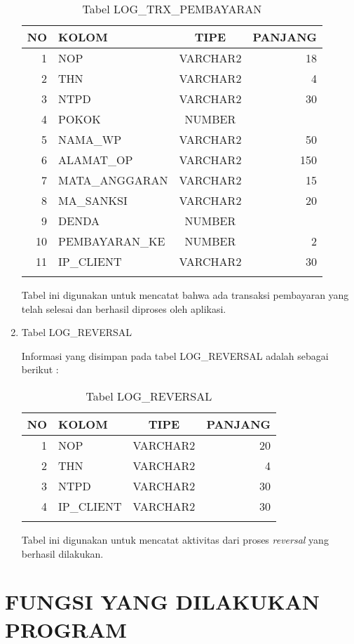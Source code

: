 \documentclass[pdftex,12pt, oneside]{article}
\begin{document}
\begin{enumerate}[1.]
  \begin{longtable}{|r|l|c|r|}
    \hline
    \textbf{NO} & \textbf{KOLOM} & \textbf{TIPE} & \textbf{PANJANG} \\
    \hline \hline
    1 & NOP & VARCHAR2 & 18 \\
    \hline
    2 & THN & VARCHAR2 & 4 \\
    \hline
    3 & NTPD & VARCHAR2 & 30 \\
    \hline
    4 & POKOK & NUMBER & \\
    \hline
    5 & NAMA\_WP & VARCHAR2 & 50 \\
    \hline
    6 & ALAMAT\_OP & VARCHAR2 & 150 \\
    \hline
    7 & MATA\_ANGGARAN & VARCHAR2 & 15 \\
    \hline
    8 & MA\_SANKSI & VARCHAR2 & 20 \\
    \hline
    9 & DENDA & NUMBER & \\
    \hline
    10 & PEMBAYARAN\_KE & NUMBER & 2 \\
    \hline
    11 & IP\_CLIENT & VARCHAR2 & 30 \\
    \hline
    \caption{Tabel LOG\_TRX\_PEMBAYARAN}
  \end{longtable}	
  
  Tabel ini digunakan untuk mencatat bahwa ada transaksi pembayaran yang telah selesai dan berhasil diproses oleh aplikasi.
  
  \item Tabel LOG\_REVERSAL
  
  Informasi yang disimpan pada tabel LOG\_REVERSAL adalah sebagai berikut :
  
  \begin{longtable}{|r|l|c|r|}
    \hline
    \textbf{NO} & \textbf{KOLOM} & \textbf{TIPE} & \textbf{PANJANG} \\
    \hline \hline
    1 & NOP & VARCHAR2 & 20 \\
    \hline
    2 & THN & VARCHAR2 & 4 \\
    \hline
    3 & NTPD & VARCHAR2 & 30 \\
    \hline
    4 & IP\_CLIENT & VARCHAR2 & 30 \\
    \hline
    \caption{Tabel LOG\_REVERSAL}
  \end{longtable}
  
  Tabel ini digunakan untuk mencatat aktivitas dari proses \textit{reversal} yang berhasil dilakukan.
\end{enumerate}

\section{FUNGSI YANG DILAKUKAN PROGRAM}
\end{document}
